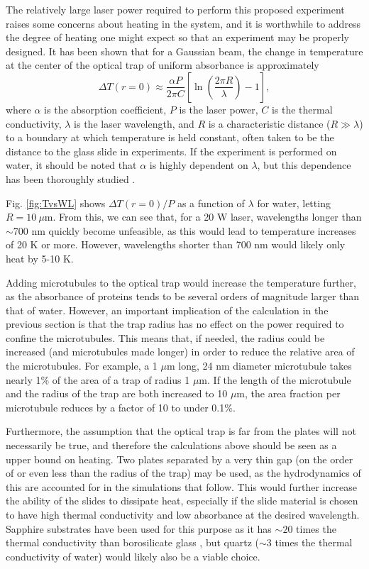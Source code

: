 \documentclass[11pt]{ucthesis}
\begin{document}
The relatively large laser power required to perform this proposed experiment raises some concerns about heating in the system, and it is worthwhile to address the degree of heating one might expect so that an experiment may be properly designed. It has been shown \cite{peterman2003laser} that for a Gaussian beam, the change in temperature at the center of the optical trap of uniform absorbance is approximately
\begin{equation}
\label{deltaT}
\Delta T(r=0) \approx \frac{\alpha P}{2\pi C}\left[\ln\left(\frac{2\pi R}{\lambda}\right)-1\right],
\end{equation}
where $\alpha$ is the absorption coefficient, $P$ is the laser power, $C$ is the thermal conductivity, $\lambda$ is the laser wavelength, and $R$ is a characteristic distance ($R\gg \lambda$) to a boundary at which temperature is held constant, often taken to be the distance to the glass slide in experiments. If the experiment is performed on water, it should be noted that $\alpha$ is highly dependent on $\lambda$, but this dependence has been thoroughly studied  \cite{kedenburg2012linear}.

Fig. \ref{fig:TvsWL} shows $\Delta T(r=0)/P$ as a function of $\lambda$ for water, letting $R = 10\ \mu$m. From this, we can see that, for a 20 W laser, wavelengths longer than $\sim$700 nm quickly become unfeasible, as this would lead to temperature increases of 20 K or more. However, wavelengths shorter than 700 nm would likely only heat by 5-10 K.

Adding microtubules to the optical trap would increase the temperature further, as the absorbance of proteins tends to be several orders of magnitude larger than that of water. However, an important implication of the calculation in the previous section is that the trap radius has no effect on the power required to confine the microtubules. This means that, if needed, the radius could be increased (and microtubules made longer) in order to reduce the relative area of the microtubules. For example, a 1 $\mu$m long, 24 nm diameter microtubule takes nearly 1\% of the area of a trap of radius 1 $\mu$m. If the length of the microtubule and the radius of the trap are both increased to 10 $\mu$m, the area fraction per microtubule reduces by a factor of 10 to under 0.1\%.

Furthermore, the assumption that the optical trap is far from the plates will not necessarily be true, and therefore the calculations above should be seen as a upper bound on heating. Two plates separated by a very thin gap (on the order of or even less than the radius of the trap) may be used, as the hydrodynamics of this are accounted for in the simulations that follow. This would further increase the ability of the slides to dissipate heat, especially if the slide material is chosen to have high thermal conductivity and low absorbance at the desired wavelength. Sapphire substrates have been used for this purpose as it has $\sim20$ times the thermal conductivity than borosilicate glass  \cite{polinkovsky2014ultrafast}, but quartz ($\sim3$ times the thermal conductivity of water) would likely also be a viable choice.
\end{document}
